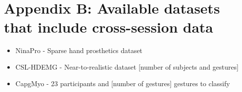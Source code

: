 \documentclass{article}
\begin{document}
\section{Appendix B: Available datasets that include cross-session data}
\begin{itemize}
\item NinaPro - Sparse hand prosthetics dataset \cite{Du2017}
\item CSL-HDEMG - Near-to-realistic dataset [number of subjects and gestures] \cite{Amma2015}
\item CapgMyo - 23 participants and [number of gestures] gestures to classify \cite{Du2017}
\end{itemize}





\end{document}
